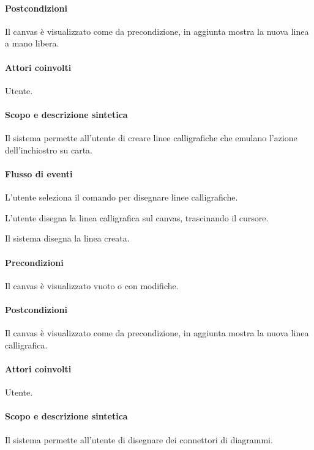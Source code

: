 \paragraph{Postcondizioni} Il canvas \`e visualizzato come da precondizione, in aggiunta mostra la nuova linea a mano libera.

\paragraph{Attori coinvolti} Utente.
\paragraph{Scopo e descrizione sintetica} 
Il sistema permette all'utente di creare linee calligrafiche che emulano l'azione dell'inchiostro su carta.
\paragraph{Flusso di eventi}
\begin{elenconumerato}[\textbf{}]{\subsubsecindent}
\item L'utente seleziona il comando per disegnare linee calligrafiche.
\item L'utente disegna la linea calligrafica sul canvas, trascinando il cursore.
\item Il sistema disegna la linea creata.
\end{elenconumerato}
\paragraph{Precondizioni} Il canvas \`e visualizzato vuoto o con modifiche.
\paragraph{Postcondizioni} Il canvas \`e visualizzato come da precondizione, in aggiunta mostra la nuova linea calligrafica.

\paragraph{Attori coinvolti} Utente.
\paragraph{Scopo e descrizione sintetica} 
Il sistema permette all'utente di disegnare dei connettori di diagrammi.
